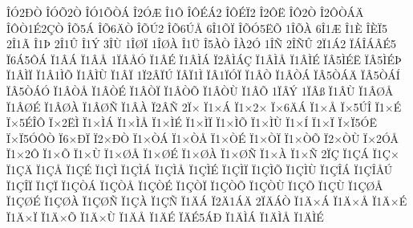 {^^ce^^d32^^d0^^d2
^^ce^^d3^^d52^^d2
^^ce^^d31^^d5^^d2^^c1
^^ce2^^d3^^c6
^^ce1^^d4
^^ce^^d4^^c9^^c12
^^ce^^d4^^c9^^cf2
^^ce2^^d4^^cb
^^ce^^d42^^d2
^^ce2^^d4^^d2^^c1^^c4
^^ce^^d4^^d21^^c92^^c7^^d2
^^ce^^d55^^c1
^^ce^^d56^^c4^^d2
^^ce^^d5^^da2
^^ce^^d56^^da^^c5
6^^ce1^^d5^^cf
^^ce^^d5^^d35^^cb^^d5
1^^ce^^d5^^c0
6^^ce1^^c6
^^ce1^^c8
^^ce^^c8^^cf5
2^^ce1^^c3
^^ce1^^de
2^^ce1^^db
^^ce1^^dd
3^^ce^^d9
1^^ce^^d8^^cf
1^^ce^^d8^^c0
^^ce1^^dc
^^ce5^^c0^^d2
^^ce^^c02^^d3
1^^ce^^d1
2^^ce^^d1^^db
2^^cf1^^c12
^^cf^^c1^^ce^^c1^^c2^^c95
^^cf6^^c15^^d4^^c1
^^cf1^^c2^^c1
^^cf1^^c2^^c5
1^^cf^^c2^^c5^^d3
^^cf1^^c2^^c9
^^cf1^^c2^^cc^^c1
^^cf2^^c2^^cc^^c1^^c7
^^cf1^^c2^^cc^^c5
^^cf1^^c2^^cc^^c9
^^cf^^c25^^cc^^c9^^cb
^^cf^^c25^^cc^^c9^^de
^^cf1^^c2^^cc^^cf
^^cf1^^c21^^cc^^d5
^^cf1^^c2^^cc^^d9
^^cf1^^c2^^cf
1^^cf2^^c2^^cf^^da
^^cf^^c2^^cf1^^cc
^^cf^^c21^^cf^^d3^^cf
^^cf1^^c2^^d2
^^cf1^^c2^^d2^^c1
^^cf^^c25^^d2^^c1^^c4
^^cf^^c25^^d2^^c1^^cd
^^cf^^c25^^d2^^c1^^d3
^^cf1^^c2^^d2^^c5
^^cf1^^c2^^d2^^c9
^^cf1^^c2^^d2^^cf
^^cf1^^c2^^d2^^d5
^^cf1^^c2^^d2^^d9
^^cf1^^c2^^d5
1^^cf^^c2^^dd
1^^cf^^c2^^df
^^cf1^^c2^^d9
^^cf1^^c2^^d8^^c5
^^cf1^^c2^^d8^^c9
^^cf1^^c2^^d8^^c0
^^cf1^^c2^^d8^^d1
^^cf1^^c2^^c0
^^cf2^^c2^^d1
2^^cf^^d7
^^cf1^^d7^^c1
^^cf1^^d72^^d7
^^cf^^d76^^c4^^c1
^^cf1^^d7^^c5
^^cf^^d75^^da^^ce
^^cf1^^d7^^c9
^^cf^^d75^^c9^^ce^^d4
^^cf^^d72^^cb^^cc
^^cf1^^d7^^cc^^c1
^^cf1^^d7^^cc^^c5
^^cf1^^d7^^cc^^c9
^^cf1^^d7^^cc^^cf
^^cf1^^d7^^cc^^d5
^^cf1^^d7^^cc^^d9
^^cf1^^d7^^cd
^^cf1^^d7^^cf
^^cf^^d7^^cf5^^d3^^cb
^^cf^^d7^^cf5^^d3^^d4^^d2
^^cf6^^d7^^d0^^cf
^^cf2^^d7^^d0^^d2
^^cf1^^d7^^d2^^c1
^^cf1^^d7^^d2^^c5
^^cf1^^d7^^d2^^c9
^^cf1^^d7^^d2^^cf
^^cf1^^d7^^d2^^d5
^^cf2^^d7^^d2^^d9
^^cf^^d72^^d3^^c5
^^cf1^^d72^^d4
^^cf1^^d7^^d5
^^cf1^^d7^^d9
^^cf1^^d7^^d8^^c5
^^cf1^^d7^^d8^^c9
^^cf1^^d7^^d8^^c0
^^cf1^^d7^^d8^^d1
^^cf1^^d7^^c0
^^cf1^^d7^^d1
2^^cf^^c7
^^cf1^^c7^^c1
^^cf1^^c7^^d7
^^cf1^^c7^^c4
^^cf1^^c7^^c5
^^cf1^^c7^^c9
^^cf1^^c7^^cc
^^cf1^^c7^^cc^^c1
^^cf1^^c7^^cc^^c5
^^cf1^^c7^^cc^^c9
^^cf1^^c7^^cc^^cf
^^cf1^^c7^^cc^^d5
^^cf1^^c7^^cc^^d9
^^cf1^^c7^^ce^^c1
^^cf1^^c7^^ce^^c5^^da
^^cf1^^c7^^ce^^cf
^^cf1^^c7^^cf
^^cf1^^c7^^d2^^c1
^^cf1^^c7^^d2^^c5
^^cf1^^c7^^d2^^c9
^^cf1^^c7^^d2^^cf
^^cf1^^c7^^d2^^d5
^^cf1^^c7^^d2^^d9
^^cf1^^c7^^d5
^^cf1^^c7^^d9
^^cf1^^c7^^d8^^c5
^^cf1^^c7^^d8^^c9
^^cf1^^c7^^d8^^c0
^^cf1^^c7^^d8^^d1
^^cf1^^c7^^c0
^^cf1^^c7^^d1
^^cf1^^c4^^c1
^^cf2^^c41^^c1^^c4
2^^cf^^c4^^c1^^d2
^^cf1^^c4^^d7^^c1
^^cf1^^c4^^d7^^c5
^^cf1^^c4^^d7^^c9
^^cf1^^c4^^d7^^cf
^^cf1^^c4^^d7^^d5
^^cf1^^c4^^d7^^d9
^^cf1^^c4^^c5
^^cf1^^c4^^c9
^^cf^^c4^^c95^^c1^^d0
^^cf1^^c4^^cc^^c1
^^cf1^^c4^^cc^^c5
^^cf1^^c4^^cc^^c9
}
